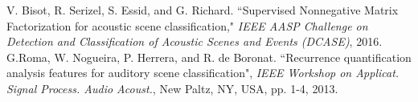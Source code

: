 {\small
\begin{thebibliography}{99}
    V. Bisot, R. Serizel, S. Essid, and G. Richard.
    ``Supervised Nonnegative Matrix Factorization for acoustic scene classification,"
    {\it IEEE AASP Challenge on Detection and Classification of Acoustic Scenes and Events (DCASE)},
    2016.
    G.Roma, W. Nogueira, P. Herrera, and R. de Boronat.
    ``Recurrence quantification analysis features for auditory scene classification",
    {\it IEEE Workshop on Applicat. Signal Process. Audio Acoust.},
    New Paltz, NY, USA, pp. 1-4, 2013.
\end{thebibliography}}
